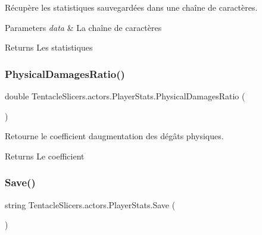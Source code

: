 Récupère les statistiques sauvegardées dans une chaîne de caractères. 


\begin{DoxyParams}{Parameters}
{\em data} & La chaîne de caractères \\
\hline
\end{DoxyParams}
\begin{DoxyReturn}{Returns}
Les statistiques 
\end{DoxyReturn}
\mbox{\label{class_tentacle_slicers_1_1actors_1_1_player_stats_a094235ee4cd7603bab14329f307daeb6}} 
\subsubsection{\texorpdfstring{Physical\+Damages\+Ratio()}{PhysicalDamagesRatio()}}
{\footnotesize\ttfamily double Tentacle\+Slicers.\+actors.\+Player\+Stats.\+Physical\+Damages\+Ratio (\begin{DoxyParamCaption}{ }\end{DoxyParamCaption})}



Retourne le coefficient d\textquotesingle{}augmentation des dégâts physiques. 

\begin{DoxyReturn}{Returns}
Le coefficient 
\end{DoxyReturn}
\mbox{\label{class_tentacle_slicers_1_1actors_1_1_player_stats_a0d09e82d6cd66e67a8100c67a7b977ba}} 
\subsubsection{\texorpdfstring{Save()}{Save()}}
{\footnotesize\ttfamily string Tentacle\+Slicers.\+actors.\+Player\+Stats.\+Save (\begin{DoxyParamCaption}{ }\end{DoxyParamCaption})}



